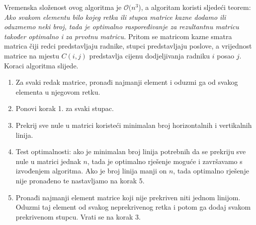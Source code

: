 \documentclass[times, utf8, zavrsni]{fer}
\begin{document}
Vremenska složenost ovog algoritma je $\mathcal{O}(n^3$), a algoritam koristi sljedeći teorem:
\emph{Ako svakom elementu bilo kojeg retka ili stupca matrice kazne dodamo ili oduzmemo neki broj, tada je optimalno raspoređivanje za rezultantnu matricu također optimalno i za prvotnu matricu.} Pritom se matricom kazne smatra matrica čiji redci predstavljaju radnike, stupci predstavljaju poslove, a vrijednost matrice na mjestu $C(i, j)$ predstavlja cijenu dodjeljivanja radniku $i$ posao $j$.
Koraci algoritma slijede.
\begin{enumerate}
  \item Za svaki redak matrice, pronađi najmanji element i oduzmi ga od svakog elementa u njegovom retku.
  \item Ponovi korak 1. za svaki stupac.
  \item Prekrij sve nule u matrici koristeći minimalan broj horizontalnih i vertikalnih linija.
  \item Test optimalnosti: ako je minimalan broj linija potrebnih da se prekriju sve nule u matrici jednak $n$, tada je optimalno rješenje moguće
  i završavamo s izvođenjem algoritma. Ako je broj linija manji on $n$, tada optimalno rješenje nije pronađeno te nastavljamo na korak 5.
  \item Pronađi najmanji element matrice koji nije prekriven niti jednom linijom. Oduzmi taj element od svakog neprekrivenog
  retka i potom ga dodaj svakom prekrivenom stupcu. Vrati se na korak 3.
\end{enumerate}
\end{document}
